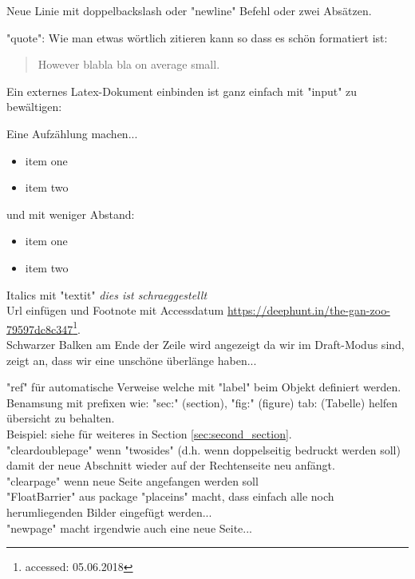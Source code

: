 \documentclass[a4paper,twoside,11pt,openright,table,draft]{article} %
\begin{document}
Neue Linie mit doppelbackslash oder "newline" Befehl oder zwei Absätzen. \newline


"quote": Wie man etwas wörtlich zitieren kann so dass es schön formatiert ist:
\begin{quote}However blabla bla on average small.
\end{quote}


Ein externes Latex-Dokument einbinden ist ganz einfach mit "input" zu bewältigen:

 
Eine Aufzählung machen...
\begin{itemize}
	\item item one
	\item item two
\end{itemize}

und mit weniger Abstand:
\begin{itemize}[noitemsep]
	\item item one
	\item item two
\end{itemize}


Italics mit "textit" \textit{dies ist schraeggestellt}\\

Url einfügen und Footnote mit Accessdatum \url{https://deephunt.in/the-gan-zoo-79597dc8c347}\footnote{accessed: 05.06.2018}.\\
Schwarzer Balken am Ende der Zeile wird angezeigt da wir im Draft-Modus sind, zeigt an, dass wir eine unschöne überlänge haben...


"ref" für automatische Verweise welche mit "label" beim Objekt definiert werden. Benamsung mit prefixen wie: "sec:" (section), "fig:" (figure) tab: (Tabelle) helfen übersicht zu behalten.\\
Beispiel: siehe für weiteres in Section \ref{sec:second_section}.\\

"cleardoublepage" wenn "twosides" (d.h. wenn doppelseitig bedruckt werden soll) damit der neue Abschnitt wieder auf der Rechtenseite neu anfängt.\\
"clearpage" wenn neue Seite angefangen werden soll\\
"FloatBarrier" aus package "placeins" macht, dass einfach alle noch herumliegenden Bilder eingefügt werden...\\
"newpage" macht irgendwie auch eine neue Seite...\\
\end{document}
